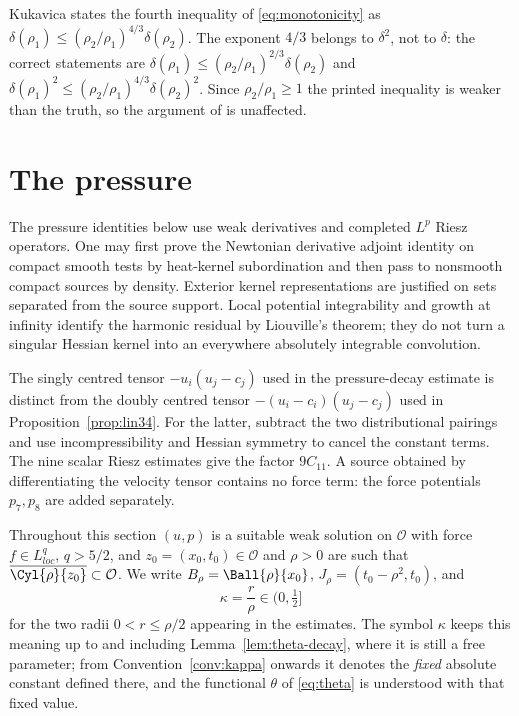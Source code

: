 \documentclass[11pt,reqno]{amsart}
\begin{document}
\begin{remark}\label{rem:kukavica-monotonicity}
Kukavica \cite[(2.23) and the line above it]{Kukavica2008} states the fourth
inequality of \eqref{eq:monotonicity} as
$\delta(\rho_{1})\le(\rho_{2}/\rho_{1})^{4/3}\delta(\rho_{2})$. The exponent
$4/3$ belongs to $\delta^{2}$, not to $\delta$: the correct statements are
$\delta(\rho_{1})\le(\rho_{2}/\rho_{1})^{2/3}\delta(\rho_{2})$ and
$\delta(\rho_{1})^{2}\le(\rho_{2}/\rho_{1})^{4/3}\delta(\rho_{2})^{2}$. Since
$\rho_{2}/\rho_{1}\ge1$ the printed inequality is weaker than the truth, so the
argument of \cite{Kukavica2008} is unaffected.
\end{remark}

\section{The pressure}\label{sec:pressure}

\begin{remark}
The pressure identities below use weak derivatives and completed $L^p$
Riesz operators. One may first prove the Newtonian derivative adjoint
identity on compact smooth tests by heat-kernel subordination and then
pass to nonsmooth compact sources by density. Exterior kernel
representations are justified on sets separated from the source support.
Local potential integrability and growth at infinity identify the
harmonic residual by Liouville's theorem; they do not turn a singular
Hessian kernel into an everywhere absolutely integrable convolution.

The singly centred tensor $-u_i(u_j-c_j)$ used in the pressure-decay
estimate is distinct from the doubly centred tensor
$-(u_i-c_i)(u_j-c_j)$ used in Proposition~\ref{prop:lin34}.
For the latter, subtract the two distributional pairings and use
incompressibility and Hessian symmetry to cancel the constant terms.
The nine scalar Riesz estimates give the factor $9C_{11}$.
A source obtained by differentiating the velocity tensor contains no
force term: the force potentials $p_7,p_8$ are added separately.
\end{remark}

Throughout this section $(u,p)$ is a suitable weak solution on $\mathcal{O}$
with force $f\in L^{q}_{loc}$, $q>5/2$, and $z_{0}=(x_{0},t_{0})\in\mathcal{O}$
and $\rho>0$ are such that $\overline{\Cyl{\rho}{z_{0}}}\subset\mathcal{O}$. We write
$B_{\rho}=\Ball{\rho}{x_{0}}$, $J_{\rho}=(t_{0}-\rho^{2},t_{0})$, and
\begin{equation}\label{eq:kappa}
  \kappa=\frac r\rho\in\bigl(0,\tfrac12\bigr]
\end{equation}
for the two radii $0<r\le\rho/2$ appearing in the estimates. The symbol
$\kappa$ keeps this meaning up to and including Lemma~\ref{lem:theta-decay},
where it is still a free parameter; from Convention~\ref{conv:kappa} onwards it
denotes the \emph{fixed} absolute constant defined there, and the functional
$\theta$ of \eqref{eq:theta} is understood with that fixed value.
\end{document}
